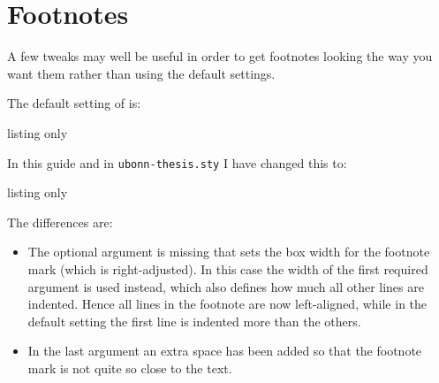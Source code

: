 \section{Footnotes}%
\label{sec:layout:footnote}

A few tweaks may well be useful in order to get footnotes looking the
way you want them rather than using the default \KOMAScript{}
settings.

The default setting of \KOMAScript{} is:
\begin{tcblisting}{listing only}
\end{tcblisting}
In this guide and in \texttt{ubonn-thesis.sty} I have changed this to:
\begin{tcblisting}{listing only}
\end{tcblisting}
The differences are:
\begin{itemize}
\item The optional argument is missing that sets the box width for the
  footnote mark (which is right-adjusted). In this case the width of
  the first required argument is used instead, which also defines how
  much all other lines are indented. Hence all lines in the footnote
  are now left-aligned, while in the default setting the first line is
  indented more than the others.
\item In the last argument an extra space has been added so that the
  footnote mark is not quite so close to the text.
\end{itemize}

